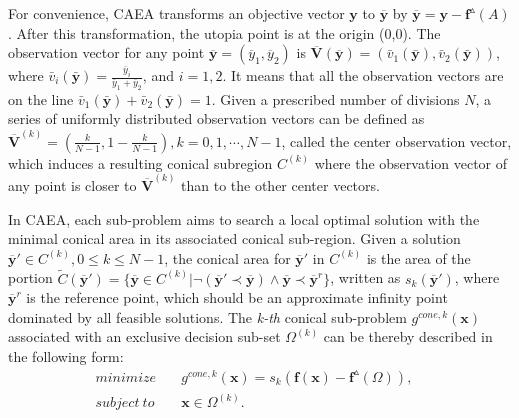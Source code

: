 \documentclass[10pt, journal]{IEEEtran}
\begin{document}
For convenience, CAEA transforms an objective vector $\mathbf{y}$ to $\overline{\mathbf{y}}$ by $\overline{\mathbf{y}}= \mathbf{y}-\mathbf{f}^{\vartriangle}(A)$. After this transformation, the utopia point is at the origin (0,0). The observation vector for any point $\overline{\mathbf{y}}= (\overline{y}_1,\overline{y}_2)$ is $\overline{\textbf{V}}(\overline{\mathbf{y}})= (\bar{v}_1(\bar{\mathbf{y}}),\bar{v}_2(\bar{\mathbf{y}}))$, where $\bar{v}_i(\bar{\mathbf{y}})=\frac{\bar{y}_i}{\bar{y}_1+\bar{y}_2}$, and $i=1,2$. It means that all the observation vectors are on the line $\bar{v}_1(\bar{\mathbf{y}})+\bar{v}_2(\bar{\mathbf{y}})=1$. Given a prescribed number of divisions $N$, a series of uniformly distributed observation vectors can be defined as $\overline{\textbf{V}}^{(k)}=(\frac{k}{N-1},1-\frac{k}{N-1}),k=0,1,\cdots,N-1$, called the center observation vector, which induces a resulting conical subregion $C^{(k)}$ where the observation vector of any point is closer to $\overline{\textbf{V}}^{(k)}$ than to the other center vectors.

In CAEA, each sub-problem aims to search a local optimal solution with the minimal conical area in its associated conical sub-region.
Given a solution $\overline{\mathbf{y}}{'}\in {C}^{(k)}, 0\leq k\leq N-1$,
the conical area for $\overline{\mathbf{y}}{'}$ in ${C}^{(k)}$ is the area of the
portion $\tilde{C}(\overline{\mathbf{y}}{'})= \{\overline{\mathbf{y}}\in
{C}^{(k)}|\neg(\overline{\mathbf{y}}{'}\prec \overline{\mathbf{y}})\wedge
\overline{\mathbf{y}}\prec \overline{\mathbf{y}}^{r}\}$, written as
$s_k(\overline{\mathbf{y}}{'})$,
where $\overline{\mathbf{y}}^{r}$ is the reference point, which should be an
approximate infinity point dominated by all feasible solutions.
The \emph{k-th} conical sub-problem $g^{cone,k}(\textbf{x})$ associated with an exclusive decision sub-set $\Omega^{(k)}$ can be thereby described in the following form:
\begin{equation}
\begin{aligned}
minimize \quad &g^{cone,k}(\textbf{x})=s_k(\mathbf{f}(\textbf{x})-\mathbf{f}^{\vartriangle}(\Omega)),&\\
subject\ to \quad  &\textbf{x}\in\Omega^{(k)}.&
\end{aligned}
\end{equation}

\end{document}
